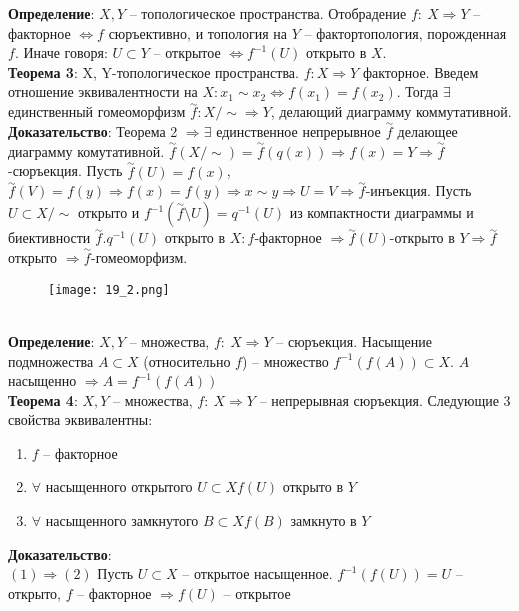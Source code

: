 	\textbf{Определение}: $X, Y$ -- топологическое пространства. Отобрадение $f:\ X \Rightarrow Y$ -- факторное $\Leftrightarrow f$ сюръективно, и топология на $Y$ -- фактортопология, порожденная $f$. Иначе говоря: $U\subset Y$ -- открытое $\Leftrightarrow f^{-1}(U)$ открыто в $X$.\\
	\textbf{Теорема 3}: X, Y-топологическое  пространства. $f: X \Rightarrow Y$ факторное. Введем отношение эквивалентности на $X: x_1 \sim x_2 \Leftrightarrow f(x_1) = f(x_2)$. Тогда $\exists$ единственный гомеоморфизм $\overset{\sim}{f} : X\slash \sim \Rightarrow Y$, делающий диаграмму коммутативной.
	\textbf{Доказательство}: Теорема 2 $\Rightarrow \exists$ единственное непрерывное $\overset{\sim}{f}$ делающее диаграмму комутативной. $\overset{\sim}{f}(X\slash \sim)=\overset{\sim}{f}(q(x)) \Rightarrow f(x) = Y \Rightarrow \overset{\sim}{f}$-сюръекция. Пусть $\overset{\sim}{f}(U)=f(x)$, $\overset{\sim}{f}(V) = f(y) \Rightarrow f(x) =f(y) \Rightarrow x\sim y \Rightarrow U=V \Rightarrow \overset{\sim}{f}$-инъекция. Пусть $U\subset X\slash \sim$ открыто и $f^{-1}(\overset{\sim}{f}\setminus U)=q^{-1}(U)$ из компактности диаграммы и биективности $\overset{\sim}{f}. q^{-1}(U)$ открыто в $X: f$-факторное $\Rightarrow \overset{\sim}{f}(U)$-открыто в $Y \Rightarrow \overset{\sim}{f}$ открыто $\Rightarrow \overset{\sim}{f}$-гомеоморфизм.\\
	\begin{figure}[h!]
		\centering
		\texttt{[image: 19\_2.png]}
	\end{figure}\\
	\textbf{Определение}: $X,Y$ -- множества, $f:\ X \Rightarrow Y$ -- сюръекция. Насыщение подмножества $A\subset X$ (относительно $f$) -- множество $f^{-1}(f(A))\subset X$. $A$ насыщенно $\Rightarrow A = f^{-1}(f(A))$\\
	\textbf{Теорема 4}: $X,Y$ -- множества, $f:\ X \Rightarrow Y$ -- непрерывная сюръекция. Следующие 3 свойства эквивалентны:\\
	\begin{enumerate}
		\item 
		$f$ -- факторное
		\item 
		$\forall $ насыщенного открытого $U \subset X f(U)$ открыто в $Y$
		\item 
		$\forall $ насыщенного замкнутого $B \subset X f(B)$ замкнуто в $Y$
	\end{enumerate}
	\textbf{Доказательство}:\\
	$(1) \Rightarrow (2)$ Пусть $U\subset X$ -- открытое насыщенное. $f^{-1}(f(U)) = U$ -- открыто, $f$ -- факторное $\Rightarrow f(U)$ -- открытое \\
